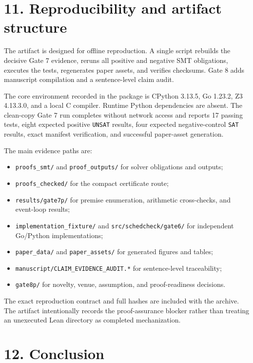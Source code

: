 \documentclass[10pt,a4paper]{article}
\newcommand{\tightlist}{\setlength{\itemsep}{0pt}\setlength{\parskip}{0pt}}
\begin{document}
\section{11. Reproducibility and artifact
structure}\label{reproducibility-and-artifact-structure}

The artifact is designed for offline reproduction. A single script
rebuilds the decisive Gate 7 evidence, reruns all positive and negative
SMT obligations, executes the tests, regenerates paper assets, and
verifies checksums. Gate 8 adds manuscript compilation and a
sentence-level claim audit.

The core environment recorded in the package is CPython 3.13.5, Go
1.23.2, Z3 4.13.3.0, and a local C compiler. Runtime Python dependencies
are absent. The clean-copy Gate 7 run completes without network access
and reports 17 passing tests, eight expected positive \texttt{UNSAT}
results, four expected negative-control \texttt{SAT} results, exact
manifest verification, and successful paper-asset generation.

The main evidence paths are:

\begin{itemize}
\tightlist
\item
  \texttt{proofs\_smt/} and \texttt{proof\_outputs/} for solver
  obligations and outputs;
\item
  \texttt{proofs\_checked/} for the compact certificate route;
\item
  \texttt{results/gate7p/} for premise enumeration, arithmetic
  cross-checks, and event-loop results;
\item
  \texttt{implementation\_fixture/} and \texttt{src/schedcheck/gate6/}
  for independent Go/Python implementations;
\item
  \texttt{paper\_data/} and \texttt{paper\_assets/} for generated
  figures and tables;
\item
  \texttt{manuscript/CLAIM\_EVIDENCE\_AUDIT.*} for sentence-level
  traceability;
\item
  \texttt{gate8p/} for novelty, venue, assumption, and proof-readiness
  decisions.
\end{itemize}

The exact reproduction contract and full hashes are included with the
archive. The artifact intentionally records the proof-assurance blocker
rather than treating an unexecuted Lean directory as completed
mechanization.

\section{12. Conclusion}\label{conclusion}
\end{document}
